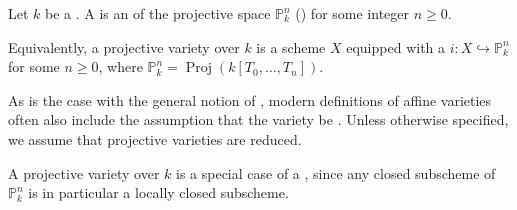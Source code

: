 \begin{definition} \label{definition:projective_variety_over_a_field}
Let $k$ be a . A  is an  of the projective space $\mathbb{P}^n_k$ () for some integer $n \geq 0$.

Equivalently, a projective variety over $k$ is a scheme $X$ equipped with a  $i: X \hookrightarrow \mathbb{P}^n_k$ for some $n \geq 0$, where $\mathbb{P}^n_k = \operatorname{Proj}(k[T_0, \dots, T_n])$.

As is the case with the general notion of , modern definitions of affine varieties often also include the assumption that the variety be . Unless otherwise specified, we assume that projective varieties are reduced.


A projective variety over $k$ is a special case of a , since any closed subscheme of $\mathbb{P}^n_k$ is in particular a locally closed subscheme.
\end{definition}
